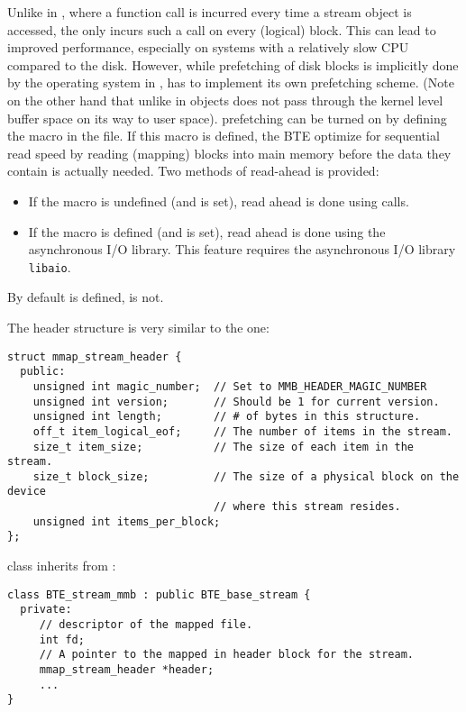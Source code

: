Unlike in , where a function call is incurred every time a
stream object is accessed, the  only incurs such a call on
every (logical) block. This can lead to improved performance, especially on
systems with a relatively slow CPU compared to the disk. However, while
prefetching of disk blocks is implicitly done by the operating system in
,  has to implement its own prefetching
scheme. (Note on the other hand that unlike in  objects
does not pass through the kernel level buffer space on its way to user
space).  prefetching can be turned on by defining the macro
 in the  file. If this macro is
defined, the BTE optimize for sequential read speed by reading (mapping)
blocks into main memory before the data they contain is actually
needed. Two methods of read-ahead is provided:
\begin{itemize}
\item If the  macro is undefined (and
 is set), read ahead is done using 
calls.
\item If the  macro is defined (and
 is set), read ahead is done using the
asynchronous I/O library. This feature requires the asynchronous I/O
library {\tt libaio}.
\end{itemize}
By default  is defined,  is
not.

The  header structure is very similar to the 
one:
\begin{verbatim}
struct mmap_stream_header { 
  public:
    unsigned int magic_number;  // Set to MMB_HEADER_MAGIC_NUMBER
    unsigned int version;       // Should be 1 for current version.
    unsigned int length;        // # of bytes in this structure.
    off_t item_logical_eof;     // The number of items in the stream.
    size_t item_size;           // The size of each item in the stream.
    size_t block_size;          // The size of a physical block on the device
                                // where this stream resides.
    unsigned int items_per_block;
};
\end{verbatim}

 class inherits from :
\begin{verbatim}
class BTE_stream_mmb : public BTE_base_stream {
  private:
     // descriptor of the mapped file.  
     int fd;   
     // A pointer to the mapped in header block for the stream. 
     mmap_stream_header *header;
     ...
}  
\end{verbatim}

